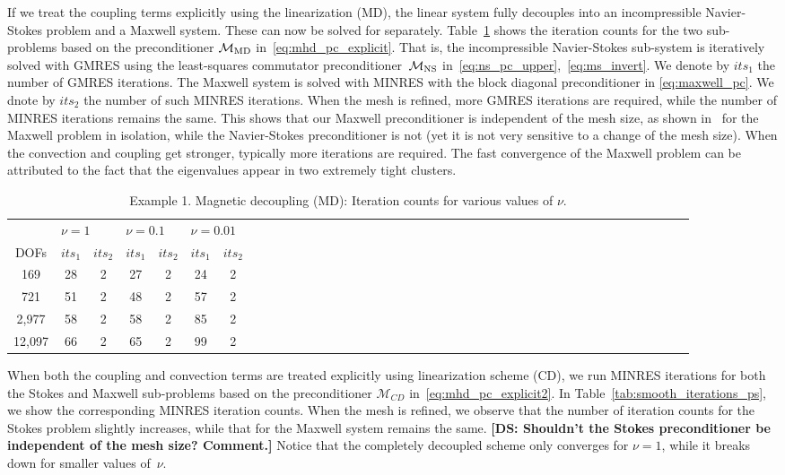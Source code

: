 \documentclass{siamltex}
\begin{document}
If we treat the coupling terms explicitly using the linearization (MD), the linear system fully decouples into an
incompressible Navier-Stokes problem and a Maxwell system. These can now be solved for separately. Table~\ref{tab:smooth_iterations_pe} shows the iteration counts for the two sub-problems based on the preconditioner ${\mathcal M}_{\rm MD}$ in~\eqref{eq:mhd_pc_explicit}. That is, the incompressible Navier-Stokes sub-system is iteratively solved with GMRES using the least-squares commutator preconditioner~$\mathcal{M}_{\rm NS}$ in~\eqref{eq:ns_pc_upper},~\eqref{eq:ms_invert}.
We denote by $its_1$ the number of GMRES iterations.
The Maxwell system is solved with MINRES with the block diagonal preconditioner in \eqref{eq:maxwell_pc}. We dnote by $its_2$ the number of such MINRES iterations.
When the mesh is refined, more GMRES iterations are required, while the number of MINRES iterations remains the same. This shows that our Maxwell preconditioner is independent of the mesh size, as shown in~\cite{Greif07} for the Maxwell problem in isolation, while the Navier-Stokes preconditioner is not (yet it is not very sensitive to a change of the mesh size).
When the convection and coupling get stronger, typically more iterations are required.
The fast convergence of the Maxwell problem can be attributed to the fact that the eigenvalues appear in two extremely tight clusters.

\begin{table}[!ht]
\begin{center}
\begin{tabular}{cccccccccccccccccccccccccccccccccccccccccc}
\hline
& \multicolumn{2}{l}{$\nu=1$} & \multicolumn{2}{l}{$\nu=0.1$} & \multicolumn{2}{l}{$\nu=0.01$} \\
DOFs & $its_1$ & $its_2$ & $its_1$ & $its_2$ & $its_1$ & $its_2$\\
\hline
169 & 28 & 2 & 27 & 2 & 24 & 2\\
721 & 51 & 2 & 48 & 2 & 57 & 2 \\
2,977 & 58 & 2 & 58 & 2 & 85 & 2\\
12,097 & 66 & 2 & 65 & 2 & 99 & 2\\
\hline
\end{tabular}
\caption{Example 1. Magnetic decoupling (MD): Iteration counts for various values of $\nu$.}
\label{tab:smooth_iterations_pe}
\end{center}
\end{table}

When both the coupling and convection terms are treated explicitly using linearization scheme (CD), we run MINRES iterations for both the Stokes and Maxwell sub-problems based on
the preconditioner $\mathcal{M}_{CD}$ in~\eqref{eq:mhd_pc_explicit2}.
In Table~\ref{tab:smooth_iterations_ps}, we show the corresponding MINRES iteration counts.
When the mesh is refined, we observe that the number of iteration counts for the Stokes problem slightly increases, while that for the Maxwell system remains the same.
{\bf [DS: Shouldn't the Stokes preconditioner be independent of the mesh size? Comment.]}
Notice that the completely decoupled scheme only converges for $\nu=1$, while
it breaks down for smaller values of~$\nu$.
\end{document}
